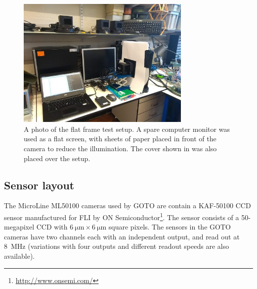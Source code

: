 \begin{colsection}
\begin{colsection}
\begin{figure}[p]
    \begin{center}
        \includegraphics[width=0.75\textwidth]{images/flat_photo.jpg}
    \end{center}
    \caption[The flat frame test setup]{
        A photo of the flat frame test setup. A spare computer monitor was used as a flat screen, with sheets of paper placed in front of the camera to reduce the illumination. The cover shown in  was also placed over the setup.
    }\label{fig:flat_photo}
\end{figure}

\clearpage

\end{colsection}

\subsection{Sensor layout}
\label{sec:chip_layout}
\begin{colsection}

The MicroLine ML50100 cameras used by GOTO are contain a KAF-50100 CCD sensor manufactured for FLI by ON Semiconductor\footnote{\url{http://www.onsemi.com/}}. The sensor consists of a 50-megapixel CCD with $\SI{6}{\micro\metre} \times \SI{6}{\micro\metre}$ square pixels. The sensors in the GOTO cameras have two channels each with an independent output, and read out at \SI{8}{\mega\hertz} (variations with four outputs and different readout speeds are also available).


\end{colsection}
\end{colsection}
